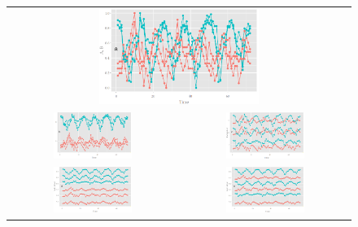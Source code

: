 \documentclass[12pt]{article}
\providecommand{\tabularnewline}{\\}
\begin{document}
\begin{itemize}
\begin{center}
\begin{figure}[htp]
\begin{centering}
\begin{tabular}{cc}
\multicolumn{2}{c}{\includegraphics[width=0.48\textwidth]{graph/pipeline-14-1}}\tabularnewline
\includegraphics[width=0.48\textwidth]{graph/pipeline-14-2} & \includegraphics[width=0.48\textwidth]{graph/pipeline-14-3}\tabularnewline
\includegraphics[width=0.48\textwidth]{graph/pipeline-14-4} & \includegraphics[width=0.48\textwidth]{graph/pipeline-14-5}\tabularnewline
\end{tabular}
\end{centering}


\end{figure}
\end{center}
\end{itemize}
\end{document}
